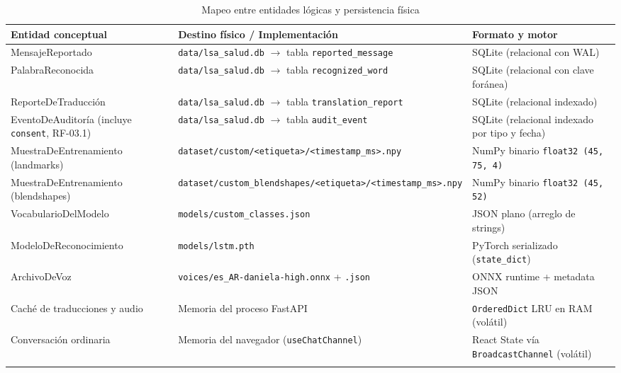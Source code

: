 \small
\begin{longtable}{>{\raggedright\arraybackslash}p{4.0cm} >{\raggedright\arraybackslash}p{4.8cm} >{\raggedright\arraybackslash}p{5.0cm}}
    \toprule
    \textbf{Entidad conceptual} & \textbf{Destino físico / Implementación} & \textbf{Formato y motor} \\
    \midrule
    \endhead
    MensajeReportado &
    \texttt{data/lsa\_salud.db} $\rightarrow$ tabla \texttt{reported\_message} &
    SQLite (relacional con WAL) \\

    PalabraReconocida &
    \texttt{data/lsa\_salud.db} $\rightarrow$ tabla \texttt{recognized\_word} &
    SQLite (relacional con clave foránea) \\

    ReporteDeTraducción &
    \texttt{data/lsa\_salud.db} $\rightarrow$ tabla \texttt{translation\_report} &
    SQLite (relacional indexado) \\

    EventoDeAuditoría (incluye \texttt{consent}, RF-03.1) &
    \texttt{data/lsa\_salud.db} $\rightarrow$ tabla \texttt{audit\_event} &
    SQLite (relacional indexado por tipo y fecha) \\

    MuestraDe\allowbreak Entrenamiento (landmarks) &
    \texttt{dataset/\allowbreak custom/\allowbreak <etiqueta>/\allowbreak <timestamp\_ms>.npy} &
    NumPy binario \texttt{float32 (45, 75, 4)} \\

    MuestraDe\allowbreak Entrenamiento (blendshapes) &
    \texttt{dataset/\allowbreak custom\_\allowbreak blendshapes/\allowbreak <etiqueta>/\allowbreak <timestamp\_ms>.npy} &
    NumPy binario \texttt{float32 (45, 52)} \\

    VocabularioDelModelo &
    \texttt{models/\allowbreak custom\_classes.json} &
    JSON plano (arreglo de strings) \\

    ModeloDe\allowbreak Reconocimiento &
    \texttt{models/\allowbreak lstm.pth} &
    PyTorch serializado (\texttt{state\_dict}) \\

    ArchivoDeVoz &
    \texttt{voices/es\_AR-daniela-high.onnx} + \texttt{.json} &
    ONNX runtime + metadata JSON \\

    Caché de traducciones y audio &
    Memoria del proceso FastAPI &
    \texttt{OrderedDict} LRU en RAM (volátil) \\

    Conversación ordinaria &
    Memoria del navegador (\texttt{useChatChannel}) &
    React State vía \texttt{BroadcastChannel} (volátil) \\
    \bottomrule
    \caption{Mapeo entre entidades lógicas y persistencia física}
    \label{tab:dat-mapeo-fisico}
\end{longtable}
